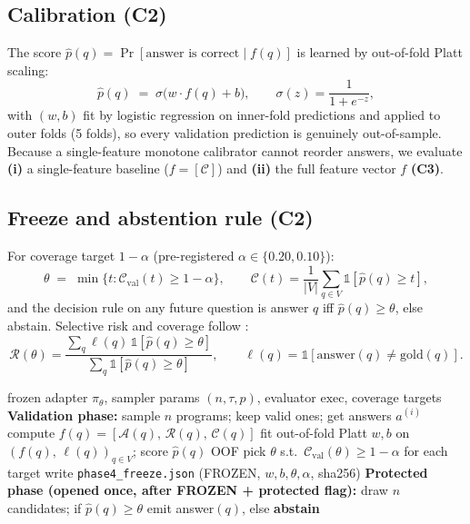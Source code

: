 \documentclass[10pt]{article}
\newcommand{\ourmethod}{EVG-CAS}
\newcommand{\RR}{\mathcal{R}}
\newcommand{\CC}{\mathcal{C}}
\newcommand{\p}{\hat p}
\begin{document}
\subsection{Calibration (C2)}
The score $\p(q) = \Pr[\text{answer is correct} \mid f(q)]$ is learned by out-of-fold
Platt scaling:
\begin{equation}
  \p(q) \;=\; \sigma\!\big(w\cdot f(q) + b\big), \qquad
  \sigma(z) = \frac{1}{1+e^{-z}} ,
\end{equation}
with $(w,b)$ fit by logistic regression on inner-fold predictions and applied to outer folds
(5 folds), so every validation prediction is genuinely out-of-sample. Because a single-feature
monotone calibrator cannot reorder answers, we evaluate \textbf{(i)} a single-feature baseline
($f=[\mathcal{C}]$) and \textbf{(ii)} the full feature vector $f$ \textbf{(C3)}.

\subsection{Freeze and abstention rule (C2)}
For coverage target $1-\alpha$ (pre-registered $\alpha \in \{0.20, 0.10\}$):
\begin{equation}
  \theta \;=\; \min\Big\{ t : \CC_{\text{val}}(t) \ge 1-\alpha \Big\},
  \qquad \CC(t) = \frac{1}{|V|}\sum_{q\in V}\mathbb{1}[\p(q)\ge t],
\end{equation}
and the decision rule on any future question is answer $q$ iff $\p(q) \ge \theta$, else abstain.
Selective risk and coverage follow \citep{eliyaniv2010selective}:
\begin{equation}
  \RR(\theta)=\frac{\sum_{q} \ell(q)\,\mathbb{1}[\p(q)\ge\theta]}
                   {\sum_{q}\mathbb{1}[\p(q)\ge\theta]}, \qquad
  \ell(q) = \mathbb{1}[\text{answer}(q)\neq \text{gold}(q)].
\end{equation}

\begin{algorithm}[t]
\caption{\ourmethod{} decision pipeline (fit once on validation; frozen thereafter)}
\begin{algorithmic}[1]
\Require frozen adapter $\pi_\theta$, sampler params $(n,\tau,p)$, evaluator $\text{exec}$, coverage targets
\State \textbf{Validation phase:}
  \State sample $n$ programs; keep valid ones; get answers $a^{(i)}$
  \State compute $f(q)=[\mathcal{A}(q),\,\mathcal{R}(q),\,\mathcal{C}(q)]$
\EndFor
\State fit out-of-fold Platt $w,b$ on $(f(q),\,\ell(q))_{q\in V}$; score $\p(q)$ OOF
\State pick $\theta$ s.t.\ $\CC_{\text{val}}(\theta) \ge 1-\alpha$ for each target
\State write \texttt{phase4\_freeze.json} (FROZEN, $w,b,\theta,\alpha$, sha256)
\State \textbf{Protected phase (opened once, after FROZEN + protected flag):}
  \State draw $n$ candidates; if $\p(q) \ge \theta$ emit answer$(q)$, else \textbf{abstain}
\EndFor
\end{algorithmic}
\end{algorithm}
\end{document}
